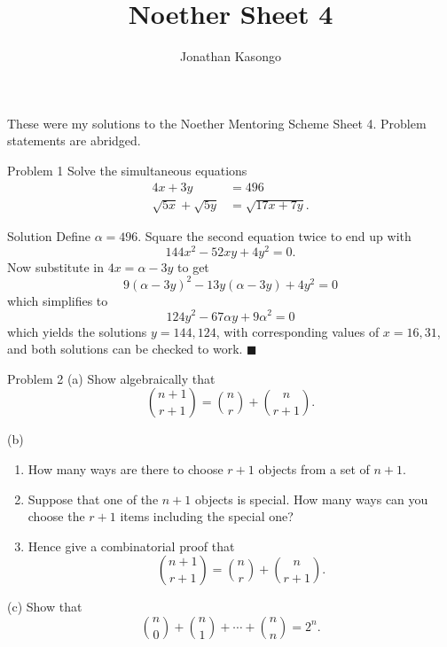 \documentclass{article}
\author{Jonathan Kasongo}
\title{Noether Sheet 4}
\begin{document}
\maketitle
\centerline{
These were my solutions to the Noether Mentoring Scheme Sheet 4. Problem
statements are abridged.
}

\begin{problem}{Problem 1}
Solve the simultaneous equations
\[
\begin{aligned}
4x + 3y &= 496\\
\sqrt{5x} + \sqrt{5y} &= \sqrt{17x + 7y}.
\end{aligned}
\]
\end{problem}

\begin{solution}{Solution}
Define $\alpha = 496$. Square the second equation twice to end up with
$$
144x^2 - 52xy + 4y^2 = 0.
$$
Now substitute in $4x = \alpha - 3y$ to get
$$
9(\alpha - 3y)^2 - 13y(\alpha - 3y) + 4y^2 = 0
$$
which simplifies to
$$
124y^2 - 67\alpha y + 9\alpha^2 = 0
$$
which yields the solutions $y = 144, 124$, with corresponding values of
$x = 16, 31$, and both solutions can be checked to work. $\blacksquare$
\end{solution}
\newpage

\begin{problem}{Problem 2}
(a) Show algebraically that
$$
\binom{n+1}{r+1} = \binom{n}{r} + \binom{n}{r+1}.
$$
\vspace{0.1cm}

(b)
\vspace{-0.65cm}
\begin{enumerate}[label=\roman*.]
  \item How many ways are there to choose $r+1$ objects from a set of $n+1$.
  \item Suppose that one of the $n+1$ objects is special. How many ways can
  you choose the $r+1$ items including the special one?
  \item Hence give a combinatorial proof that $$
  \binom{n+1}{r+1} = \binom{n}{r} + \binom{n}{r+1}.
  $$
\end{enumerate}

(c) Show that
$$\binom{n}{0} + \binom{n}{1} + \cdots + \binom{n}{n} = 2^n.$$
\end{problem}
\end{document}
